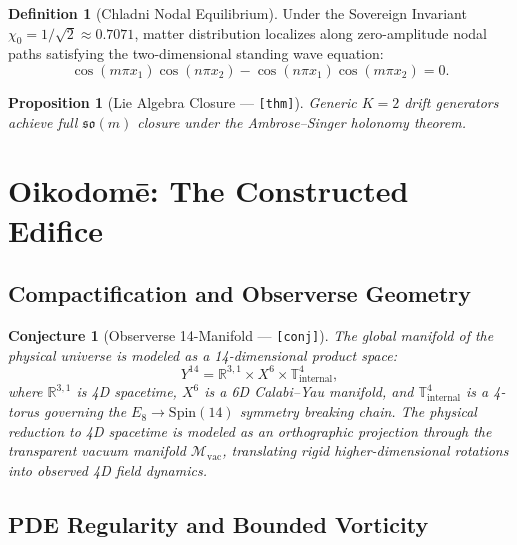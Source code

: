 \documentclass[12pt,letterpaper]{article}
\theoremstyle{plain}
\newtheorem{proposition}[theorem]{Proposition}
\newtheorem{conjecture}[theorem]{Conjecture}
\theoremstyle{definition}
\newtheorem{definition}[theorem]{Definition}
\begin{document}
\begin{definition}[Chladni Nodal Equilibrium]\label{def:chladni}
Under the Sovereign Invariant $\chi_0 = 1/\sqrt{2} \approx 0.7071$, matter distribution localizes along zero-amplitude nodal paths satisfying the two-dimensional standing wave equation:
\begin{equation}\label{eq:chladni}
  \cos(m\pi x_1)\cos(n\pi x_2) - \cos(n\pi x_1)\cos(m\pi x_2) = 0.
\end{equation}
\end{definition}

\begin{proposition}[Lie Algebra Closure --- {\normalfont\texttt{[thm]}}]
\label{prop:lie_closure}
Generic $K=2$ drift generators achieve full $\mathfrak{so}(m)$ closure under the Ambrose--Singer holonomy theorem.
\end{proposition}

\section{Oikodom\={e}: The Constructed Edifice}
\label{sec:oikodome}

\subsection{Compactification and Observerse Geometry}

\begin{conjecture}[Observerse 14-Manifold --- {\normalfont\texttt{[conj]}}]
\label{conj:observerse}
The global manifold of the physical universe is modeled as a 14-dimensional product space:
\begin{equation}\label{eq:observerse}
  Y^{14} = \mathbb{R}^{3,1} \times X^6 \times \mathbb{T}^4_{\mathrm{internal}},
\end{equation}
where $\mathbb{R}^{3,1}$ is 4D spacetime, $X^6$ is a 6D Calabi--Yau manifold, and $\mathbb{T}^4_{\mathrm{internal}}$ is a 4-torus governing the $E_8 \to \mathrm{Spin}(14)$ symmetry breaking chain. The physical reduction to 4D spacetime is modeled as an orthographic projection through the transparent vacuum manifold $\mathcal{M}_{\mathrm{vac}}$, translating rigid higher-dimensional rotations into observed 4D field dynamics.
\end{conjecture}

\subsection{PDE Regularity and Bounded Vorticity}
\end{document}
